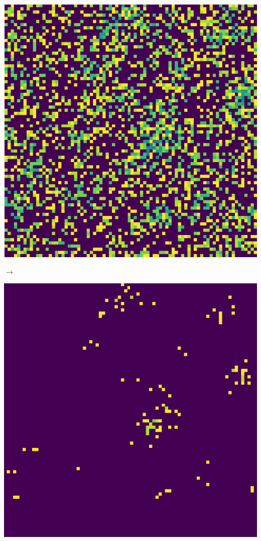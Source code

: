 \documentclass[12pt, a4paper]{article}
\begin{document}
\begin{center}
\begin{minipage}{.17\linewidth}
                    \includegraphics[scale=0.15]{img/part3/2/step2.png}
                \end{minipage}
                $\rightarrow$
                \begin{minipage}{.17\linewidth}
                    \includegraphics[scale=0.15]{img/part3/2/step3.png}

\end{minipage}
\end{center}
\end{document}
